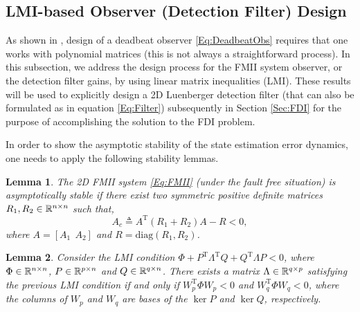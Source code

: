 \documentclass[journal,12pt,draftcls,onecolumn]{IEEEtran}
\newcommand{\tran}{\mathrm{T}}
\newcommand{\diag}{\mathrm{diag}}
\def\QEDclosed{\hfill\IEEEQEDclosed}
\renewcommand{\qed}{\QEDclosed}
\newtheorem{lemma}{Lemma}
\begin{document}
\subsection{LMI-based Observer (Detection Filter) Design}\label{Sec:Observer}
As shown in \cite{Bisiacco_Obs}, design of a deadbeat observer \eqref{Eq:DeadbeatObs} requires that one works with polynomial matrices (this is not always a straightforward process). In this subsection, we address the design process for the FMII system observer, or the detection filter gains, by using linear matrix inequalities (LMI). These results will be used to explicitly design a 2D Luenberger detection filter (that can also be formulated as in equation \eqref{Eq:Filter}) subsequently in Section \ref{Sec:FDI} for the  purpose of accomplishing the solution to the FDI problem. 

In order to show the asymptotic stability of the state estimation error dynamics, one needs to apply the following stability lemmas.

\begin{lemma}\label{Lem:2DLyapunov}\cite{2DLyapunov}
	The 2D FMII system \eqref{Eq:FMII} (under the fault free situation) is asymptotically stable if there exist two symmetric positive definite matrices $R_1,R_2\in\mathbb{R}^{n\times n}$ such that,
	\begin{equation}\label{Eq:2DLyapunov}
		A_c  \triangleq A^\tran (R_1+R_2) A- R <0,
	\end{equation}
	where $A = [A_1~~A_2]$ and $R=\diag(R_1,R_2)$.\qed
\end{lemma}
\begin{lemma}\label{Lem:2DLMIBasic}\cite{LMI1D}
	Consider the LMI condition $\Phi + P^\tran\Lambda^\tran Q+ Q^\tran\Lambda P<0$,
	where $\Phi\in\mathbb{R}^{n\times n}$, $P\in\mathbb{R}^{p\times n}$ and $Q\in\mathbb{R}^{q\times n}$. There exists a matrix $\Lambda\in\mathbb{R}^{q\times p}$ satisfying the previous LMI condition if and only if
	$W_p^\tran\Phi W_p<0$ and $W_q^\tran\Phi W_q<0$, where the columns of $W_p$ and $W_q$ are bases of the $\ker P$ and $\ker Q$, respectively.\qed
\end{lemma}
\end{document}
